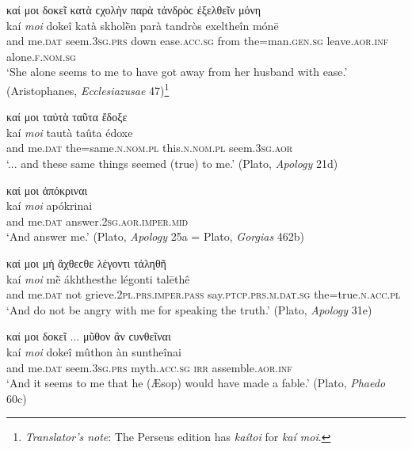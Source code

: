 \begin{exe}
\ex καί μοι δοκεῖ κατὰ ϲχολὴν παρὰ τἀνδρὸϲ ἐξελθεῖν μόνη\\
\gll kaí \emph{moi} dokeî katà skholḕn parà tandròs exeltheîn mónē\\
and me.\textsc{dat} seem.\textsc{3sg.prs} down ease.\textsc{acc.sg}
from the=man.\textsc{gen.sg} leave.\textsc{aor.inf} alone.\textsc{f.nom.sg}\\
\trans `She alone seems to me to have got away from her husband with ease.' (Aristophanes, \textit{Ecclesiazusae} 47)\footnote{\emph{Translator's note}: The Perseus edition has \textit{kaítoi} for \textit{kaí moi}.}
\label{kaimoi36}
\end{exe}

\begin{exe}
\ex καί μοι ταὐτὰ ταῦτα ἔδοξε\\
\gll kaí \emph{moi} tautà taûta édoxe\\
and me.\textsc{dat} the=same.\textsc{n.nom.pl} this.\textsc{n.nom.pl}
seem.\textsc{3sg.aor}\\
\trans `... and these same things seemed (true) to me.' (Plato, \textit{Apology} 21d)
\label{kaimoi37}
\end{exe}

\begin{exe}
\ex καί μοι ἀπόκριναι\\
\gll kaí \emph{moi} apókrinai\\
and me.\textsc{dat} answer.\textsc{2sg.aor.imper.mid}\\
\trans `And answer me.' (Plato, \textit{Apology} 25a = Plato, \textit{Gorgias} 462b)
\label{kaimoi38}
\end{exe}

\begin{exe}
\ex καί μοι μὴ ἄχθεϲθε λέγοντι τἀληθῆ\\
\gll kaí \emph{moi} mḕ ákhthesthe légonti talēthê\\
and me.\textsc{dat} not grieve.\textsc{2pl.prs.imper.pass}
say.\textsc{ptcp.prs.m.dat.sg} the=true.\textsc{n.acc.pl}\\
\trans `And do not be angry with me for speaking the truth.' (Plato, \textit{Apology} 31e)
\label{kaimoi39}
\end{exe}

\begin{exe}
\ex καί μοι δοκεῖ ... μῦθον ἂν ϲυνθεῖναι\\
\gll kaí \emph{moi} dokeî mûthon àn suntheînai\\
and me.\textsc{dat} seem.\textsc{3sg.prs} myth.\textsc{acc.sg} \textsc{irr}
assemble.\textsc{aor.inf}\\
\trans `And it seems to me that he (Æsop) would have made a fable.' (Plato, \textit{Phaedo} 60c)\\
\label{kaimoi40}
\end{exe}

